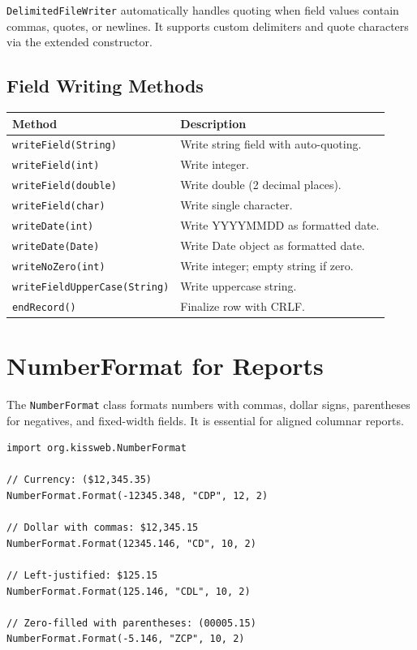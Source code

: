 \noindent
\texttt{DelimitedFileWriter} automatically handles quoting when field values contain commas, quotes, or newlines.  It supports custom delimiters and quote characters via the extended constructor.

\subsection{Field Writing Methods}

\begin{longtable}{P{4.8cm}P{5.7cm}}
\toprule
\textbf{Method} & \textbf{Description} \\
\midrule
\endhead
\texttt{writeField(String)} & Write string field with auto-quoting. \\
\texttt{writeField(int)} & Write integer. \\
\texttt{writeField(double)} & Write double (2 decimal places). \\
\texttt{writeField(char)} & Write single character. \\
\texttt{writeDate(int)} & Write YYYYMMDD as formatted date. \\
\texttt{writeDate(Date)} & Write Date object as formatted date. \\
\texttt{writeNoZero(int)} & Write integer; empty string if zero. \\
\texttt{writeFieldUpperCase(\allowbreak String)} & Write uppercase string. \\
\texttt{endRecord()} & Finalize row with CRLF. \\
\bottomrule
\end{longtable}

\section{NumberFormat for Reports}
\label{sec:rpt-numberformat}

The \texttt{NumberFormat} class formats numbers with commas, dollar signs, parentheses for negatives, and fixed-width fields.  It is essential for aligned columnar reports.

\begin{lstlisting}[style=groovy]
import org.kissweb.NumberFormat

// Currency: ($12,345.35)
NumberFormat.Format(-12345.348, "CDP", 12, 2)

// Dollar with commas: $12,345.15
NumberFormat.Format(12345.146, "CD", 10, 2)

// Left-justified: $125.15
NumberFormat.Format(125.146, "CDL", 10, 2)

// Zero-filled with parentheses: (00005.15)
NumberFormat.Format(-5.146, "ZCP", 10, 2)
\end{lstlisting}


